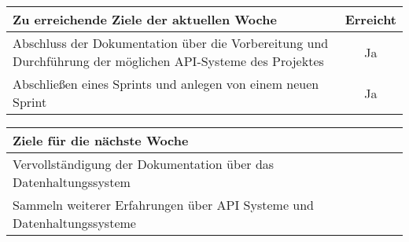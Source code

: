 \begin{tabularx}{\textwidth}{Xc}
    \arrayrulecolor{OliveGreen}
    \toprule
    {\bfseries Zu erreichende Ziele der aktuellen Woche} & {\bfseries Erreicht} \\
    \midrule[2pt]
    Abschluss der Dokumentation über die Vorbereitung und Durchführung der
    möglichen API-Systeme des Projektes  &  Ja  \\
    \rowcolor{OliveGreen!15}
    Abschließen eines Sprints und anlegen von einem neuen Sprint  &  Ja  \\
    \bottomrule[2pt]
\end{tabularx}
%
\vspace{1cm}
%
\begin{tabularx}{\textwidth}{Xc}
    \arrayrulecolor{OliveGreen}
    \toprule
    {\bfseries Ziele für die nächste Woche}              &                   \\
    \midrule[2pt]
    Vervollständigung der Dokumentation über das Datenhaltungssystem  &      \\
    \rowcolor{OliveGreen!15}
    Sammeln weiterer Erfahrungen über API Systeme und Datenhaltungssysteme & \\
\end{tabularx}
